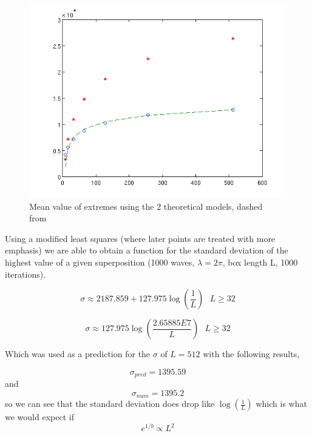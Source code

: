 \documentclass[12pt]{article}
\begin{document}
\begin{figure}[hpt]
	\centering
		\includegraphics[width=1.00\textwidth]{complex_meanEx_wLog.png}
	\caption{Mean value of extremes using the 2 theoretical models, dashed from~\cite{RA98}}
	\label{fig:complex_meanEx_wLog}
\end{figure}


Using a modified least squares (where later points are treated with more emphasis) we are able to obtain a function for the standard deviation of the highest value of a given superposition (1000 waves, $\lambda = 2\pi$, box length L, 1000 iterations).

\[\sigma \approx 2187.859 + 127.975\log(\frac{1}{L}) \ \ \ L \geq 32\]

\[\sigma \approx 127.975\log(\frac{2.65885E7}{L}) \ \ \ L \geq 32\]

Which was used as a prediction for the $\sigma$ of $L=512$ with the following results,

\[\sigma_{pred} = 1395.59\]
and
\[\sigma_{num} = 1395.2\]
so we can see that the standard deviation does drop like $\log(\frac{1}{L})$ which is what we would expect if
\[e^{1/b} \propto L^{2}\]
\end{document}
